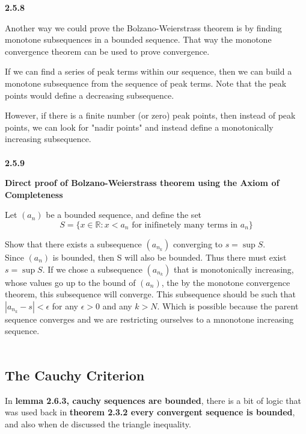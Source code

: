 \textbf{2.5.8}

Another way we could prove the Bolzano-Weierstrass theorem is by finding monotone subsequences
in a bounded sequence.
That way the monotone convergence theorem can be used to prove convergence.

If we can find a series of peak terms within our sequence, then we can build a monotone subsequence
from the sequence of peak terms.
Note that the peak points would define a decreasing subsequence.

However, if there is a finite number (or zero) peak points, then instead of peak points, we can look
for "nadir points" and instead define a monotonically increasing subsequence.
\\~\\



\textbf{2.5.9}

\textbf{Direct proof of Bolzano-Weierstrass theorem using the Axiom of Completeness}

Let $(a_n)$ be a bounded sequence, and define the set
$$
S = \{ x\in\mathbb{R} : x < a_n \text{ for inifinetely many terms in } a_n \}
$$

Show that there exists a subsequence $(a_{n_k})$ converging to $s = \sup S$.
\\

Since $(a_n)$ is bounded, then S will also be bounded.
Thus there must exist $s = \sup S$.
If we chose a subsequence $(a_{n_k})$ that is monotonically increasing, whose values go up to the bound
of $(a_n)$, the by the monotone convergence theorem, this subsequence will converge.
This subsequence should be such that $|a_{n_k} - s| < \epsilon$ for any $\epsilon > 0$
and any $k > N$.
Which is possible because the parent sequence converges and we are restricting ourselves to a mnonotone
increasing sequence.
\\~\\



\subsection{The Cauchy Criterion}

In \textbf{lemma 2.6.3, cauchy sequences are bounded}, there is a bit of logic that was used back in
\textbf{theorem 2.3.2 every convergent sequence is bounded},
and also when de discussed the triangle inequality.

